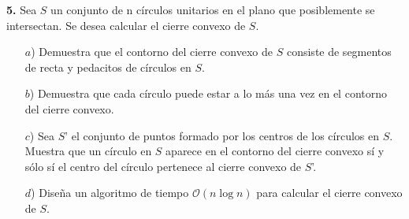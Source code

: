 \textbf{5.} Sea $S$ un conjunto de n círculos unitarios en el plano que posiblemente se intersectan.
Se desea calcular el cierre convexo de $S$.
\begin{itemize}
\item[$a$)] Demuestra que el contorno del cierre convexo de $S$ consiste de segmentos de recta y pedacitos
de círculos en $S$.
\item[$b$)] Demuestra que cada círculo puede estar a lo más una vez en el contorno del cierre convexo.
\item[$c$)] Sea $S$' el conjunto de puntos formado por los centros de los círculos en $S$. Muestra que un
círculo en $S$ aparece en el contorno del cierre convexo sí y sólo sí el centro del círculo pertenece al
cierre convexo de $S$'.
\item[$d$)] Diseña un algoritmo de tiempo $\mathcal{O}(n \log n)$ para calcular el cierre convexo de $S$.
\end{itemize}
